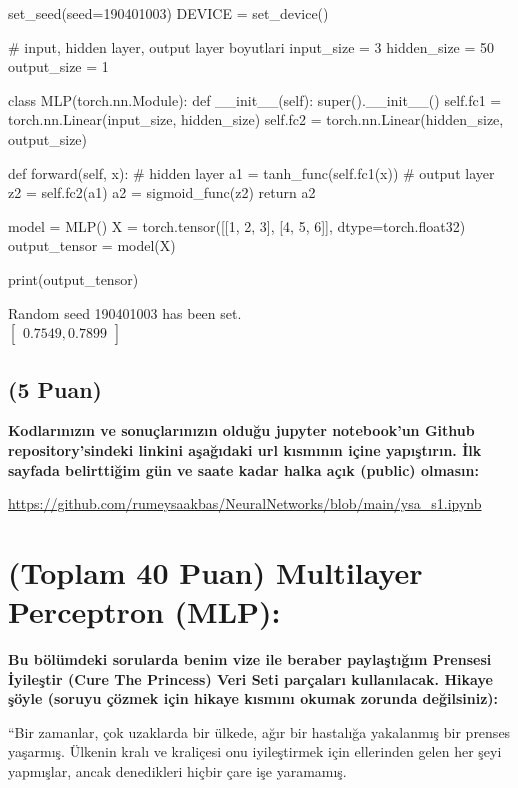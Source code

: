 \documentclass[11pt]{article}
\begin{document}
\begin{python}
set_seed(seed=190401003)
DEVICE = set_device()

# input, hidden layer, output layer boyutlari
input_size = 3
hidden_size = 50
output_size = 1

class MLP(torch.nn.Module):
    def __init__(self):
        super().__init__()
        self.fc1 = torch.nn.Linear(input_size, hidden_size)
        self.fc2 = torch.nn.Linear(hidden_size, output_size)
    
    def forward(self, x):
        # hidden layer
        a1 = tanh_func(self.fc1(x))
        # output layer
        z2 = self.fc2(a1)
        a2 = sigmoid_func(z2)
        return a2
        
model = MLP()
X = torch.tensor([[1, 2, 3], [4, 5, 6]], dtype=torch.float32)
output_tensor = model(X)

print(output_tensor)
\end{python}

Random seed 190401003 has been set.\\
$\begin{bmatrix}0.7549, 0.7899\end{bmatrix}$

\subsection{(5 Puan)} \textbf{Kodlarınızın ve sonuçlarınızın olduğu jupyter notebook'un Github repository'sindeki linkini aşağıdaki url kısmının içine yapıştırın. İlk sayfada belirttiğim gün ve saate kadar halka açık (public) olmasın:}

\url{https://github.com/rumeysaakbas/NeuralNetworks/blob/main/ysa_s1.ipynb}

\section{(Toplam 40 Puan) Multilayer Perceptron (MLP):} 
\textbf{Bu bölümdeki sorularda benim vize ile beraber paylaştığım Prensesi İyileştir (Cure The Princess) Veri Seti parçaları kullanılacak. Hikaye şöyle (soruyu çözmek için hikaye kısmını okumak zorunda değilsiniz):} 

``Bir zamanlar, çok uzaklarda bir ülkede, ağır bir hastalığa yakalanmış bir prenses yaşarmış. Ülkenin kralı ve kraliçesi onu iyileştirmek için ellerinden gelen her şeyi yapmışlar, ancak denedikleri hiçbir çare işe yaramamış.
\end{document}
